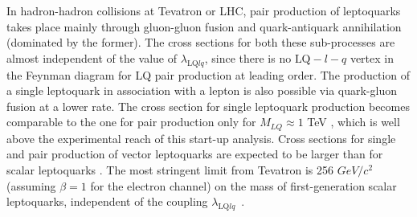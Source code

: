 %


In hadron-hadron collisions at Tevatron or LHC,
pair production of leptoquarks takes place 
mainly through gluon-gluon fusion and 
quark-antiquark annihilation (dominated by the former). 
The cross sections for both these sub-processes are almost 
independent of the value of 
$\lambda_{\mbox{LQ}lq}$, since there is 
no $\mbox{LQ}-l-q$ vertex in the Feynman diagram for LQ pair production 
at leading order. 
The production of a single leptoquark in association with a lepton 
is also possible via quark-gluon 
fusion at a lower rate. 
The cross section for single leptoquark production
becomes comparable to the one for pair production only 
for $M_{LQ}\approx 1$ TeV \cite{Belyaev:2005ew}, 
which is well above the experimental reach of this start-up analysis.  
Cross sections for single and pair production of vector leptoquarks 
are expected to be larger than for scalar leptoquarks \cite{Belyaev:2005ew}.
The most stringent limit from Tevatron is
256 $GeV/c^2$ (assuming $\beta=1$ for the electron channel) 
on the mass of first-generation scalar leptoquarks,  independent of the
coupling $\lambda_{\mbox{LQ}lq}$~\cite{Abazov:2004mk,Acosta:2005ge}.



